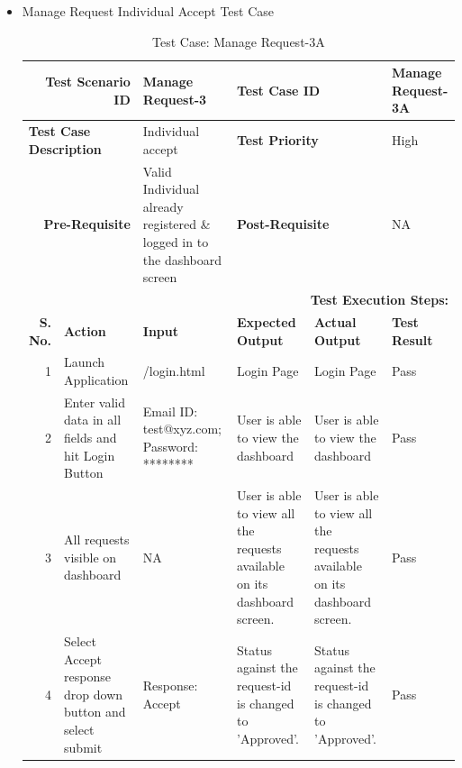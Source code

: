 \documentclass[a4paper, hidelinks, 12pt]{report}
\begin{document}
\begin{itemize}
\begin{table}[H]
\begin{tabular}{|r|p{4.355em}|p{7.715em}|p{6.43em}|p{5.855em}|p{5.07em}|}
    \bottomrule
    \end{tabular}%
  \label{tab:Test Case: Manage Request-2B}%
\end{table}%
\item{Manage Request Individual Accept Test Case}
\begin{table}[H]
  \centering
  \caption{Test Case: Manage Request-3A}
    \begin{tabular}{|r|p{4.355em}|p{7.715em}|p{6.43em}|p{5.855em}|p{5.07em}|}
    \toprule
    \multicolumn{2}{|p{13.425em}|}{\textbf{Test Scenario ID}} & Manage Request-3 & \multicolumn{2}{p{12.285em}|}{\textbf{Test Case ID}} & Manage Request-3A \\
    \midrule
    \multicolumn{2}{|l|}{\multirow{2}[2]{*}{\textbf{Test Case Description}}} & \multirow{2}[2]{*}{Individual accept} & \multicolumn{2}{l|}{\multirow{2}[2]{*}{\textbf{Test Priority}}} & \multirow{2}[2]{*}{High} \\
    \multicolumn{2}{|l|}{} & \multicolumn{1}{l|}{} & \multicolumn{2}{l|}{} & \multicolumn{1}{l|}{} \\
    \midrule
    \multicolumn{2}{|p{13.425em}|}{\textbf{Pre-Requisite}} & Valid Individual already registered \& logged in to the dashboard screen & \multicolumn{2}{p{12.285em}|}{\textbf{Post-Requisite}} & NA \\
    \midrule
    \multicolumn{6}{p{38.495em}|}{\textbf{Test Execution Steps:}} \\
    \midrule
    \multicolumn{1}{|p{5.07em}|}{\textbf{S. No.}} & \textbf{Action } & \textbf{Input} & \textbf{Expected Output} & \textbf{Actual Output} & \textbf{Test Result} \\
    \midrule
    1     & Launch Application & /login.html & Login Page & Login Page & Pass \\
    \midrule
    2     & Enter valid data in all fields and hit Login Button & Email ID: test@xyz.com; Password: ******** & User is able to view the dashboard & User is able to view the dashboard & Pass \\
    \midrule
    3     & All requests visible on dashboard & NA    & User is able to view all the requests available on its dashboard screen. & User is able to view all the requests available on its dashboard screen. & Pass \\
    \midrule
    4     & Select Accept response drop down button and select submit & Response: Accept & Status against the request-id is changed to 'Approved'. & Status against the request-id is changed to 'Approved'. & Pass \\

\end{tabular}
\end{table}
\end{itemize}
\end{document}
